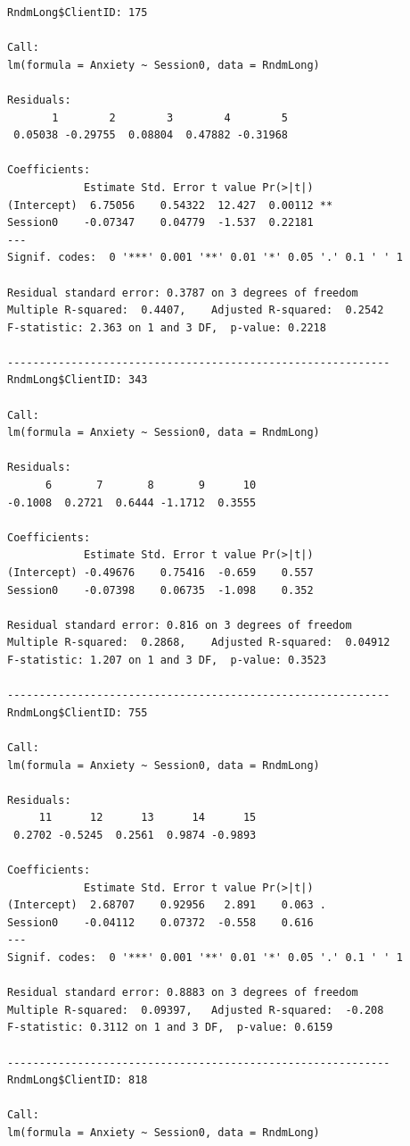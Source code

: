 \documentclass[
  english,
]{book}
\begin{document}
\begin{verbatim}
RndmLong$ClientID: 175

Call:
lm(formula = Anxiety ~ Session0, data = RndmLong)

Residuals:
       1        2        3        4        5 
 0.05038 -0.29755  0.08804  0.47882 -0.31968 

Coefficients:
            Estimate Std. Error t value Pr(>|t|)   
(Intercept)  6.75056    0.54322  12.427  0.00112 **
Session0    -0.07347    0.04779  -1.537  0.22181   
---
Signif. codes:  0 '***' 0.001 '**' 0.01 '*' 0.05 '.' 0.1 ' ' 1

Residual standard error: 0.3787 on 3 degrees of freedom
Multiple R-squared:  0.4407,    Adjusted R-squared:  0.2542 
F-statistic: 2.363 on 1 and 3 DF,  p-value: 0.2218

------------------------------------------------------------ 
RndmLong$ClientID: 343

Call:
lm(formula = Anxiety ~ Session0, data = RndmLong)

Residuals:
      6       7       8       9      10 
-0.1008  0.2721  0.6444 -1.1712  0.3555 

Coefficients:
            Estimate Std. Error t value Pr(>|t|)
(Intercept) -0.49676    0.75416  -0.659    0.557
Session0    -0.07398    0.06735  -1.098    0.352

Residual standard error: 0.816 on 3 degrees of freedom
Multiple R-squared:  0.2868,    Adjusted R-squared:  0.04912 
F-statistic: 1.207 on 1 and 3 DF,  p-value: 0.3523

------------------------------------------------------------ 
RndmLong$ClientID: 755

Call:
lm(formula = Anxiety ~ Session0, data = RndmLong)

Residuals:
     11      12      13      14      15 
 0.2702 -0.5245  0.2561  0.9874 -0.9893 

Coefficients:
            Estimate Std. Error t value Pr(>|t|)  
(Intercept)  2.68707    0.92956   2.891    0.063 .
Session0    -0.04112    0.07372  -0.558    0.616  
---
Signif. codes:  0 '***' 0.001 '**' 0.01 '*' 0.05 '.' 0.1 ' ' 1

Residual standard error: 0.8883 on 3 degrees of freedom
Multiple R-squared:  0.09397,   Adjusted R-squared:  -0.208 
F-statistic: 0.3112 on 1 and 3 DF,  p-value: 0.6159

------------------------------------------------------------ 
RndmLong$ClientID: 818

Call:
lm(formula = Anxiety ~ Session0, data = RndmLong)


\end{verbatim}
\end{document}
